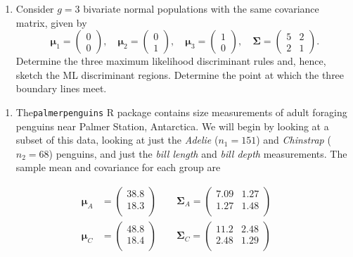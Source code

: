 \documentclass[
]{book}
\providecommand{\tightlist}{%
  \setlength{\itemsep}{0pt}\setlength{\parskip}{0pt}}
\theoremstyle{definition}
\theoremstyle{definition}
\theoremstyle{definition}
\theoremstyle{definition}
\theoremstyle{remark}
\begin{document}
\begin{enumerate}
\def\labelenumi{\arabic{enumi}.}
\setcounter{enumi}{3}
\tightlist
\item
  Consider \(g=3\) bivariate normal populations with the same covariance matrix, given by
  \[ {\boldsymbol{\mu}}_1 = \begin{pmatrix} 0 \\ 0 \end{pmatrix}, \quad
  {\boldsymbol{\mu}}_2 = \begin{pmatrix} 0 \\ 1 \end{pmatrix}, \quad
  {\boldsymbol{\mu}}_3 = \begin{pmatrix} 1 \\ 0 \end{pmatrix}, \quad
  \boldsymbol{\Sigma}= \begin{pmatrix} 5 & 2 \\ 2 & 1 \end{pmatrix}.\]
  Determine the three maximum likelihood discriminant rules and, hence, sketch the ML discriminant regions. Determine the point at which the three boundary lines meet.
\end{enumerate}

\begin{enumerate}
\def\labelenumi{\arabic{enumi}.}
\setcounter{enumi}{4}
\tightlist
\item
  The\texttt{palmerpenguins} R package contains size measurements of adult foraging penguins near Palmer Station, Antarctica.
  We will begin by looking at a subset of this data, looking at just the \emph{Adelie} (\(n_1=151\)) and \emph{Chinstrap} (\(n_2=68\)) penguins, and just the \emph{bill length} and \emph{bill depth} measurements. The sample mean and covariance for each group are
\end{enumerate}

\begin{align*}
{\boldsymbol{\mu}}_{A}&=\begin{pmatrix}38.8 \\18.3 \\\end{pmatrix} \qquad \boldsymbol{\Sigma}_A = \begin{pmatrix}7.09&1.27 \\1.27&1.48 \\\end{pmatrix}\\
{\boldsymbol{\mu}}_{C}&=\begin{pmatrix}48.8 \\18.4 \\\end{pmatrix}\qquad \boldsymbol{\Sigma}_C = \begin{pmatrix}11.2&2.48 \\2.48&1.29 \\\end{pmatrix}
\end{align*}
\end{document}
